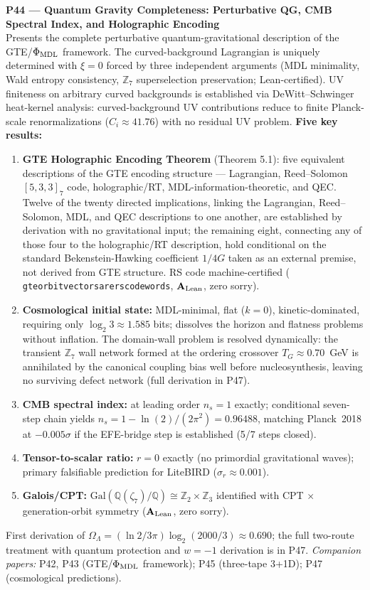 \documentclass[11pt]{article}
\newcommand{\lean}[1]{%
  \penalty-100
  \begingroup\def\_{{\textunderscore\allowbreak}}\texttt{#1}\endgroup}
\newcommand{\CatAL}{\ensuremath{\textbf{A}_{\rm Lean}}}
\begin{document}
\medskip
\noindent\textbf{P44 — Quantum Gravity Completeness: Perturbative QG, CMB Spectral Index, and Holographic Encoding}~\cite{SpivackQGR}\\
Presents the complete perturbative quantum-gravitational description of the
GTE/$\Phi_{\rm MDL}$ framework.  The curved-background Lagrangian is uniquely
determined with $\xi = 0$ forced by three independent arguments (MDL minimality,
Wald entropy consistency, $\mathbb{Z}_7$ superselection preservation; Lean-certified).
UV finiteness on arbitrary curved backgrounds is established via DeWitt--Schwinger
heat-kernel analysis: curved-background UV contributions reduce to finite Planck-scale
renormalizations ($C_i \approx 41.76$) with no residual UV problem.
\textbf{Five key results:}
\begin{enumerate}[noitemsep,topsep=2pt]
\item \textbf{GTE Holographic Encoding Theorem} (Theorem 5.1): five equivalent
  descriptions of the GTE encoding structure --- Lagrangian, Reed--Solomon
  $[5,3,3]_7$ code, holographic/RT, MDL-information-theoretic, and QEC.
  Twelve of the twenty directed implications, linking the Lagrangian,
  Reed--Solomon, MDL, and QEC descriptions to one another, are established by
  derivation with no gravitational input; the remaining eight, connecting any
  of those four to the holographic/RT description, hold conditional on the
  standard Bekenstein-Hawking coefficient $1/4G$ taken as an external
  premise, not derived from GTE structure.
  RS code machine-certified (\lean{gte\_orbit\_vectors\_are\_rs\_codewords},
  $\CatAL$, zero sorry).
\item \textbf{Cosmological initial state:} MDL-minimal, flat ($k{=}0$),
  kinetic-dominated, requiring only $\log_2 3 \approx 1.585$ bits; dissolves the
  horizon and flatness problems without inflation.  The domain-wall problem is
  resolved dynamically: the transient $\mathbb{Z}_7$ wall network formed at the
  ordering crossover $T_G \approx 0.70$~GeV is annihilated by the canonical
  coupling bias well before nucleosynthesis, leaving no surviving defect
  network (full derivation in P47).
\item \textbf{CMB spectral index:} at leading order $n_s = 1$ exactly; conditional
  seven-step chain yields $n_s = 1 - \ln(2)/(2\pi^2) = \mathbf{0.96488}$,
  matching Planck~2018 at $-0.005\sigma$ if the EFE-bridge step is established
  (5/7 steps closed).
\item \textbf{Tensor-to-scalar ratio:} $r = 0$ exactly (no primordial gravitational waves);
  primary falsifiable prediction for LiteBIRD ($\sigma_r \approx 0.001$).
\item \textbf{Galois/CPT:} $\mathrm{Gal}(\mathbb{Q}(\zeta_7)/\mathbb{Q}) \cong
  \mathbb{Z}_2 \times \mathbb{Z}_3$ identified with CPT $\times$ generation-orbit
  symmetry ($\CatAL$, zero sorry).
\end{enumerate}
First derivation of $\Omega_\Lambda = (\ln 2/3\pi)\log_2(2000/3) \approx 0.690$;
the full two-route treatment with quantum protection and $w=-1$ derivation is in P47.
\emph{Companion papers:} P42, P43 (GTE/$\Phi_{\rm MDL}$ framework); P45 (three-tape 3+1D); P47 (cosmological predictions).
\end{document}
